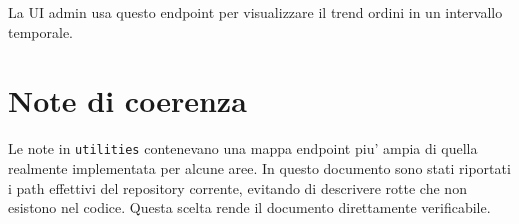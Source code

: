 La UI admin usa questo endpoint per visualizzare il trend ordini in un intervallo temporale.

\section{Note di coerenza}

Le note in \texttt{utilities} contenevano una mappa endpoint piu' ampia di quella realmente implementata per alcune aree. In questo documento sono stati riportati i path effettivi del repository corrente, evitando di descrivere rotte che non esistono nel codice. Questa scelta rende il documento direttamente verificabile.
